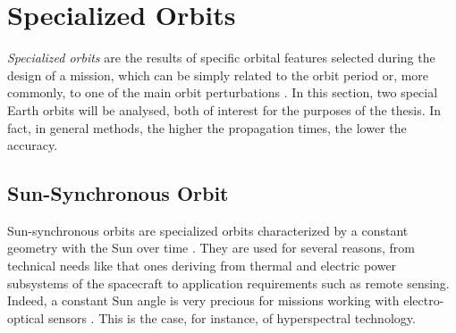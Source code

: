 \section{Specialized Orbits}
\textit{Specialized orbits} are the results of specific orbital features selected during the design of a mission, which can be simply related to the orbit period or, more commonly, to one of the main orbit perturbations \cite{wertz2009orbit}. 
In this section, two special Earth orbits will be analysed, both of interest for the purposes of the thesis.
In fact, in general methods, the higher the propagation times, the lower the accuracy.


\subsection{Sun-Synchronous Orbit} \label{sso_paragraph}
Sun-synchronous orbits are specialized orbits characterized by a constant geometry with the Sun over time \cite{vallado2013fundamentals}. 
They are used for several reasons, from technical needs like that ones deriving from thermal and electric power subsystems of the spacecraft to application requirements such as remote sensing.
Indeed, a constant Sun angle is very precious for missions working with electro-optical sensors \cite{brown1998spacecraft}.
This is the case, for instance, of hyperspectral technology. 

